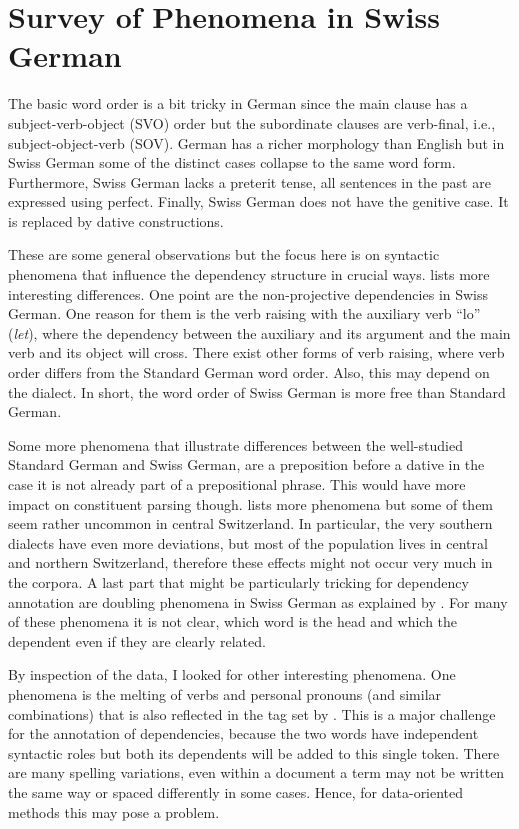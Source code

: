 \documentclass[11pt,letterpaper, covington]{article}
\begin{document}
\section{Survey of Phenomena in Swiss German}

The basic word order is a bit tricky in German since the main clause has a subject-verb-object (SVO) order but the subordinate clauses are verb-final, i.e., subject-object-verb (SOV). German has a richer morphology than English but in Swiss German some of the distinct cases collapse to the same word form. Furthermore, Swiss German lacks a preterit tense, all sentences in the past are expressed using perfect. Finally, Swiss German does not have the genitive case. It is replaced by dative constructions. \citep{Scherrer11}

These are some general observations but the focus here is on syntactic phenomena that influence the dependency structure in crucial ways. \citet{Scherrer11} lists more interesting differences. One point are the non-projective dependencies in Swiss German. One reason for them is the verb raising with the auxiliary verb ``lo'' (\emph{let}), where the dependency between the auxiliary and its argument and the main verb and its object will cross. There exist other forms of verb raising, where verb order differs from the Standard German word order. Also, this may depend on the dialect. In short, the word order of Swiss German is more free than Standard German. 

Some more phenomena that illustrate differences between the well-studied Standard German and Swiss German, are a preposition before a dative in the case it is not already part of a prepositional phrase. This would have more impact on constituent parsing though. \citet{Scherrer11} lists more phenomena but some of them seem rather uncommon in central Switzerland. In particular, the very southern dialects have even more deviations, but most of the population lives in central and northern Switzerland, therefore these effects might not occur very much in the corpora. A last part that might be particularly tricking for dependency annotation are doubling phenomena in Swiss German as explained by \citet{GF06}. For many of these phenomena it is not clear, which word is the head and which the dependent even if they are clearly related.

By inspection of the data, I looked for other interesting phenomena. One phenomena is the melting of verbs and personal pronouns (and similar combinations) that is also reflected in the tag set by \citet{AH12}. This is a major challenge for the annotation of dependencies, because the two words have independent syntactic roles but both its dependents will be added to this single token. There are many spelling variations, even within a document a term may not be written the same way or spaced differently in some cases. Hence, for data-oriented methods this may pose a problem. 
\end{document}
